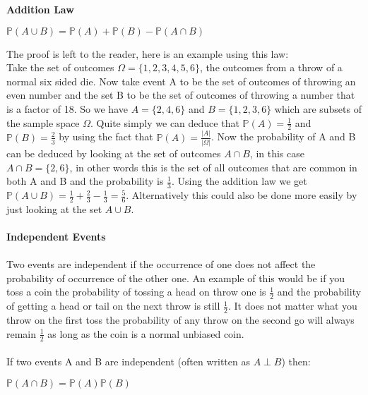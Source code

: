 \documentclass[,oneside]{article}
\begin{document}
\begin{enumerate}
\begin{itemize}
\end{itemize}
\textbf{Addition Law}\\
\begin{center}
$\mathbb{P}(A \cup B) = \mathbb{P}(A) + \mathbb{P}(B) - \mathbb{P}(A \cap B)$
\end{center}
The proof is left to the reader, here is an example using this law:\\
Take the set of outcomes $\Omega = \{1,2,3,4,5,6\}$, the outcomes from a throw of a normal six sided die. Now take event A to be the set of outcomes of throwing an even number and the set B to be the set of outcomes of throwing a number that is a factor of 18. So we have $A = \{2,4,6\}$ and $B = \{1,2,3,6\}$ which are subsets of the sample space $\Omega$. Quite simply we can deduce that $\mathbb{P}(A) = \frac{1}{2}$ and $\mathbb{P}(B) = \frac{2}{3}$ by using the fact that $\mathbb{P}(A) =\frac{|A|}{|\Omega|}$. Now the probability of A and B can be deduced by looking at the set of outcomes $A \cap B$, in this case $A \cap B = \{2,6\}$, in other words this is the set of all outcomes that are common in both A and B and the probability is $\frac{1}{3}$. Using the addition law we get $\mathbb{P}(A \cup B) = \frac{1}{2}+\frac{2}{3}-\frac{1}{3}=\frac{5}{6}$. Alternatively this could also be done more easily by just looking at the set $A \cup B$.\\ 
\\ \textbf{Independent Events}\\ \\
Two events are independent if the occurrence of one does not affect the probability of occurrence of the other one. An example of this would be if you toss a coin the probability of tossing a head on throw one is $\frac{1}{2}$ and the probability of getting a head or tail on the next throw is still $\frac{1}{2}$. It does not matter what you throw on the first toss the probability of any throw on the second go will always remain $\frac{1}{2}$ as long as the coin is a normal unbiased coin.\\
\\ If two events A and B are independent (often written as $A \perp B$) then:
\begin{center}
$\mathbb{P}(A \cap B) = \mathbb{P}(A)\mathbb{P}(B)$
\end{center}

\end{enumerate}
\end{document}
